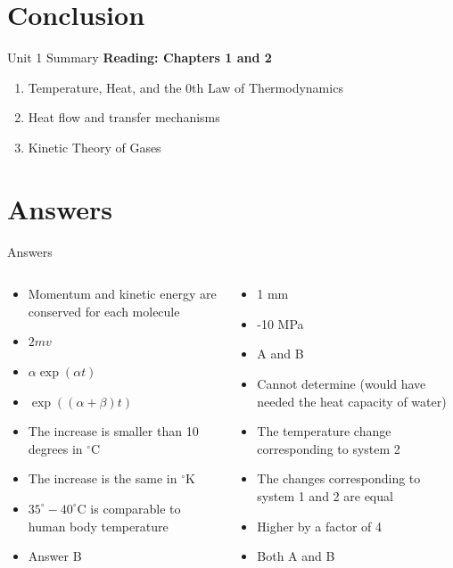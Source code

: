 \documentclass{beamer}
\begin{document}
\section{Conclusion}

\begin{frame}{Unit 1 Summary}
\textbf{Reading: Chapters 1 and 2}
\begin{enumerate}
\item Temperature, Heat, and the 0th Law of Thermodynamics
\item Heat flow and transfer mechanisms
\item Kinetic Theory of Gases
\end{enumerate}
\end{frame}

\section{Answers}

\begin{frame}{Answers}
\small
\begin{columns}[T]
\begin{column}{0.5\textwidth}
\begin{itemize}
\item Momentum and kinetic energy are conserved for each molecule
\item $2mv$
\item $\alpha\exp(\alpha t)$
\item $\exp((\alpha+\beta) t)$
\item The increase is smaller than 10 degrees in $^{\circ}$C
\item The increase is the same in $^{\circ}$K
\item $35^{\circ}-40^{\circ}$C is comparable to human body temperature
\item Answer B
\end{itemize}
\end{column}
\begin{column}{0.5\textwidth}
\begin{itemize}
\item 1 mm
\item -10 MPa
\item A and B
\item Cannot determine (would have needed the heat capacity of water)
\item The temperature change corresponding to system 2
\item The changes corresponding to system 1 and 2 are equal
\item Higher by a factor of 4
\item Both A and B
\end{itemize}
\end{column}
\end{columns}
\end{frame}
\end{document}
